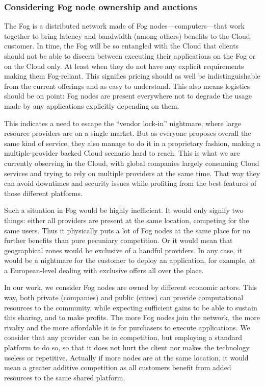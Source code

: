 \subsubsection{Considering Fog node ownership and auctions}

The Fog is a distributed network made of Fog nodes—computers—that work together to bring latency and bandwidth (among others) benefits to the Cloud customer. In time, the Fog will be so entangled with the Cloud that clients should not be able to discern between executing their applications on the Fog or on the Cloud only. At least when they do not have any explicit requirements making them Fog-reliant. This signifies pricing should as well be indistinguishable from the current offerings and as easy to understand. This also means logistics should be on point: Fog nodes are present everywhere not to degrade the usage made by any applications explicitly depending on them.

This indicates a need to escape the “vendor lock-in” nightmare, where large resource providers are on a single market. But as everyone proposes overall the same kind of service, they also manage to do it in a proprietary fashion, making a multiple-provider backed Cloud scenario hard to reach. This is what we are currently observing in the Cloud, with global companies largely consuming Cloud services and trying to rely on multiple providers at the same time. That way they can avoid downtimes and security issues while profiting from the best features of those different platforms.

Such a situation in Fog would be highly inefficient. It would only signify two things: either all providers are present at the same location, competing for the same users. Thus it physically puts a lot of Fog nodes at the same place for no further benefits than pure pecuniary competition. Or it would mean that geographical zones would be exclusive of a handful providers. In any case, it would be a nightmare for the customer to deploy an application, for example, at a European-level dealing with exclusive offers all over the place.

In our work, we consider Fog nodes are owned by different economic actors. This way, both private (companies) and public (cities) can provide computational resources to the community, while expecting sufficient gains to be able to sustain this sharing, and to make profits. The more Fog nodes join the network, the more rivalry and the more affordable it is for purchasers to execute applications. We consider that any provider can be in competition, but employing a standard platform to do so, so that it does not hurt the client nor makes the technology useless or repetitive. Actually if more nodes are at the same location, it would mean a greater additive competition as all customers benefit from added resources to the same shared platform.

